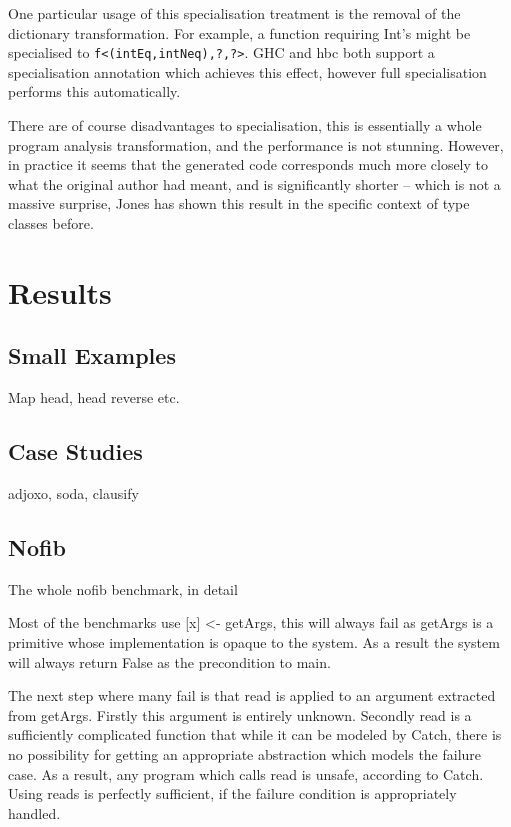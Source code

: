 \documentclass[preprint]{sigplanconf}
\newcommand{\T}[1]{\texttt{#1}}
\begin{document}
One particular usage of this specialisation treatment is the removal of the
dictionary transformation. For example, a function requiring Int's might be
specialised to \T{f<(intEq,intNeq),?,?>}. GHC and hbc both support a
specialisation annotation which achieves this effect, however full
specialisation performs this automatically.

There are of course disadvantages to specialisation, this is essentially a
whole program analysis transformation, and the performance is not stunning.
However, in practice it seems that the generated code corresponds much more
closely to what the original author had meant, and is significantly shorter --
which is not a massive surprise, Jones has shown this result in the specific
context of type classes before.




\section{Results}
\label{sec:results}

\subsection{Small Examples}

Map head, head reverse etc.


\subsection{Case Studies}

adjoxo, soda, clausify

\subsection{Nofib}

The whole nofib benchmark, in detail

Most of the benchmarks use [x] <- getArgs, this will always fail as getArgs is a primitive whose implementation is opaque to the system. As a result the system will always return False as the precondition to main.

The next step where many fail is that read is applied to an argument extracted from getArgs. Firstly this argument is entirely unknown. Secondly read is a sufficiently complicated function that while it can be modeled by Catch, there is no possibility for getting an appropriate abstraction which models the failure case. As a result, any program which calls read is unsafe, according to Catch. Using reads is perfectly sufficient, if the failure condition is appropriately handled.
\end{document}
